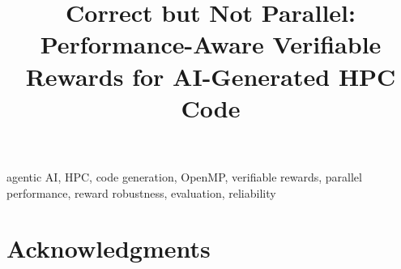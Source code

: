\documentclass[conference]{IEEEtran}
\newcommand{\note}[1]{}
\theoremstyle{definition}
\theoremstyle{plain}
\begin{document}
\title{Correct but Not Parallel:\\
Performance-Aware Verifiable Rewards for AI-Generated HPC Code}

\author{
}

\maketitle



\begin{IEEEkeywords}
agentic AI, HPC, code generation, OpenMP, verifiable rewards,
parallel performance, reward robustness, evaluation, reliability
\end{IEEEkeywords}










\section*{Acknowledgments}
\note{fill in funding / compute allocations}





\end{document}
